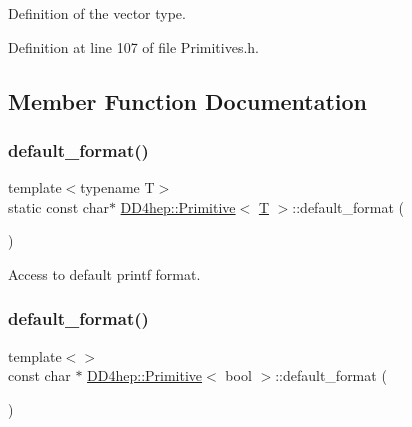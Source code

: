 Definition of the vector type. 



Definition at line 107 of file Primitives.\+h.



\subsection{Member Function Documentation}
\hypertarget{struct_d_d4hep_1_1_primitive_a27dce7707319f621a39cc7d90d55bfb0}{}\label{struct_d_d4hep_1_1_primitive_a27dce7707319f621a39cc7d90d55bfb0} 
\subsubsection{\texorpdfstring{default\+\_\+format()}{default\_format()}\hspace{0.1cm}{\footnotesize\ttfamily [1/15]}}
{\footnotesize\ttfamily template$<$typename T$>$ \\
static const char$\ast$ \hyperlink{struct_d_d4hep_1_1_primitive}{D\+D4hep\+::\+Primitive}$<$ \hyperlink{class_t}{T} $>$\+::default\+\_\+format (\begin{DoxyParamCaption}{ }\end{DoxyParamCaption})\hspace{0.3cm}{\ttfamily [static]}}



Access to default printf format. 

\hypertarget{struct_d_d4hep_1_1_primitive_ab730bf542519e33e8401f3eac4a1403f}{}\label{struct_d_d4hep_1_1_primitive_ab730bf542519e33e8401f3eac4a1403f} 
\subsubsection{\texorpdfstring{default\+\_\+format()}{default\_format()}\hspace{0.1cm}{\footnotesize\ttfamily [2/15]}}
{\footnotesize\ttfamily template$<$$>$ \\
const char $\ast$ \hyperlink{struct_d_d4hep_1_1_primitive}{D\+D4hep\+::\+Primitive}$<$ bool $>$\+::default\+\_\+format (\begin{DoxyParamCaption}{ }\end{DoxyParamCaption})}



